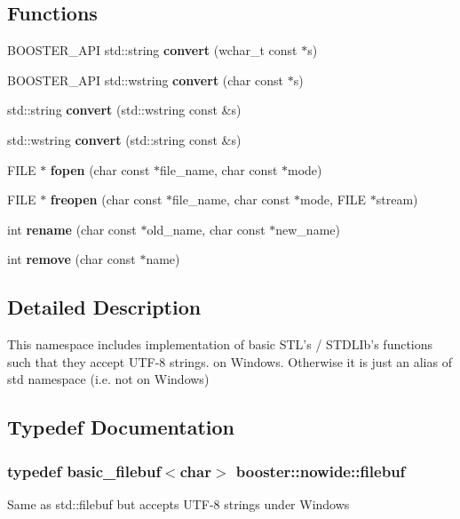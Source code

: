 \subsection*{Functions}
\begin{DoxyCompactItemize}
\item 
B\-O\-O\-S\-T\-E\-R\-\_\-\-A\-P\-I std\-::string {\bf convert} (wchar\-\_\-t const $\ast$s)
\item 
B\-O\-O\-S\-T\-E\-R\-\_\-\-A\-P\-I std\-::wstring {\bf convert} (char const $\ast$s)
\item 
std\-::string {\bf convert} (std\-::wstring const \&s)
\item 
std\-::wstring {\bf convert} (std\-::string const \&s)
\item 
F\-I\-L\-E $\ast$ {\bf fopen} (char const $\ast$file\-\_\-name, char const $\ast$mode)
\item 
F\-I\-L\-E $\ast$ {\bf freopen} (char const $\ast$file\-\_\-name, char const $\ast$mode, F\-I\-L\-E $\ast$stream)
\item 
int {\bf rename} (char const $\ast$old\-\_\-name, char const $\ast$new\-\_\-name)
\item 
int {\bf remove} (char const $\ast$name)
\end{DoxyCompactItemize}


\subsection{Detailed Description}
This namespace includes implementation of basic S\-T\-L's / S\-T\-D\-L\-Ib's functions such that they accept U\-T\-F-\/8 strings. on Windows. Otherwise it is just an alias of std namespace (i.\-e. not on Windows) 

\subsection{Typedef Documentation}
\subsubsection[{filebuf}]{\setlength{\rightskip}{0pt plus 5cm}typedef {\bf basic\-\_\-filebuf}$<$char$>$ {\bf booster\-::nowide\-::filebuf}}\label{namespacebooster_1_1nowide_af9a3f7aff0f973ee8d6782afcc3e9093}
Same as std\-::filebuf but accepts U\-T\-F-\/8 strings under Windows 

